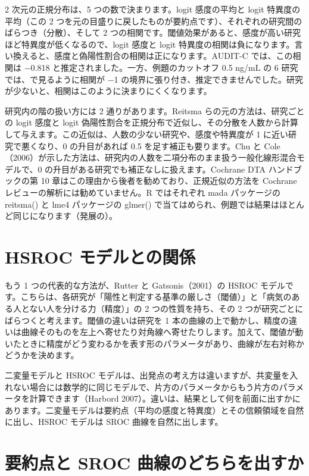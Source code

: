 2 次元の正規分布は、5 つの数で決まります。logit 感度の平均と logit 特異度の平均（この 2 つを元の目盛りに戻したものが要約点です）、それぞれの研究間のばらつき（分散）、そして 2 つの相関です。閾値効果があると、感度が高い研究ほど特異度が低くなるので、logit 感度と logit 特異度の相関は負になります。言い換えると、感度と偽陽性割合の相関は正になります。AUDIT-C では、この相関は −0.818 と推定されました。一方、例題のカットオフ 0.5 ng/mL の 6 研究では、で見るように相関が −1 の境界に張り付き、推定できませんでした。研究が少ないと、相関はこのように決まりにくくなります。

研究内の階の扱い方には 2 通りがあります。Reitsma らの元の方法は、研究ごとの logit 感度と logit 偽陽性割合を正規分布で近似し、その分散を人数から計算して与えます。この近似は、人数の少ない研究や、感度や特異度が 1 に近い研究で悪くなり、0 の升目があれば 0.5 を足す補正も要ります。Chu と Cole（2006）が示した方法は、研究内の人数を二項分布のまま扱う一般化線形混合モデルで、0 の升目がある研究でも補正なしに扱えます。Cochrane DTA ハンドブックの第 10 章はこの理由から後者を勧めており、正規近似の方法を Cochrane レビューの解析には勧めていません。R ではそれぞれ mada パッケージの reitsma() と lme4 パッケージの glmer() で当てはめられ、例題では結果はほとんど同じになります（発展の）。

\section{\hatten HSROC モデルとの関係}
\label{sec:10-5}

もう 1 つの代表的な方法が、Rutter と Gatsonis（2001）の HSROC モデルです。こちらは、各研究が「陽性と判定する基準の厳しさ（閾値）」と「病気のある人とない人を分ける力（精度）」の 2 つの性質を持ち、その 2 つが研究ごとにばらつくと考えます。閾値の違いは研究を 1 本の曲線の上で動かし、精度の違いは曲線そのものを左上へ寄せたり対角線へ寄せたりします。加えて、閾値が動いたときに精度がどう変わるかを表す形のパラメータがあり、曲線が左右対称かどうかを決めます。

二変量モデルと HSROC モデルは、出発点の考え方は違いますが、共変量を入れない場合には数学的に同じモデルで、片方のパラメータからもう片方のパラメータを計算できます（Harbord 2007）。違いは、結果として何を前面に出すかにあります。二変量モデルは要約点（平均の感度と特異度）とその信頼領域を自然に出し、HSROC モデルは SROC 曲線を自然に出します。

\section{要約点と SROC 曲線のどちらを出すか}
\label{sec:10-6}

